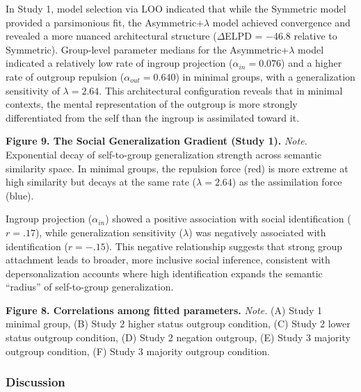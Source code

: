 \documentclass[
  man,
  longtable,
  nolmodern,
  notxfonts,
  notimes,
  man]{apa7}
\begin{document}
In Study 1, model selection via LOO indicated that while the Symmetric
model provided a parsimonious fit, the Asymmetric+\(\lambda\) model
achieved convergence and revealed a more nuanced architectural structure
(\(\Delta\)ELPD = −46.8 relative to Symmetric). Group-level parameter
medians for the Asymmetric+\(\lambda\) model indicated a relatively low
rate of ingroup projection (\(\alpha_{in} = 0.076\)) and a higher rate
of outgroup repulsion (\(\alpha_{out} = 0.640\)) in minimal groups, with
a generalization sensitivity of \(\lambda = 2.64\). This architectural
configuration reveals that in minimal contexts, the mental
representation of the outgroup is more strongly differentiated from the
self than the ingroup is assimilated toward it.

\textbf{Figure 9. The Social Generalization Gradient (Study 1).}
\emph{Note.} Exponential decay of self-to-group generalization strength
across semantic similarity space. In minimal groups, the repulsion force
(red) is more extreme at high similarity but decays at the same rate
(\(\lambda = 2.64\)) as the assimilation force (blue).

Ingroup projection (\(\alpha_{in}\)) showed a positive association with
social identification (\(r = .17\)), while generalization sensitivity
(\(\lambda\)) was negatively associated with identification
(\(r = -.15\)). This negative relationship suggests that strong group
attachment leads to broader, more inclusive social inference, consistent
with depersonalization accounts where high identification expands the
semantic ``radius'' of self-to-group generalization.

\textbf{Figure 8. Correlations among fitted parameters.} \emph{Note.}
(A) Study 1 minimal group, (B) Study 2 higher status outgroup condition,
(C) Study 2 lower status outgroup condition, (D) Study 2 negation
outgroup, (E) Study 3 majority outgroup condition, (F) Study 3 majority
outgroup condition.

\subsubsection{Discussion}\label{discussion}
\end{document}

